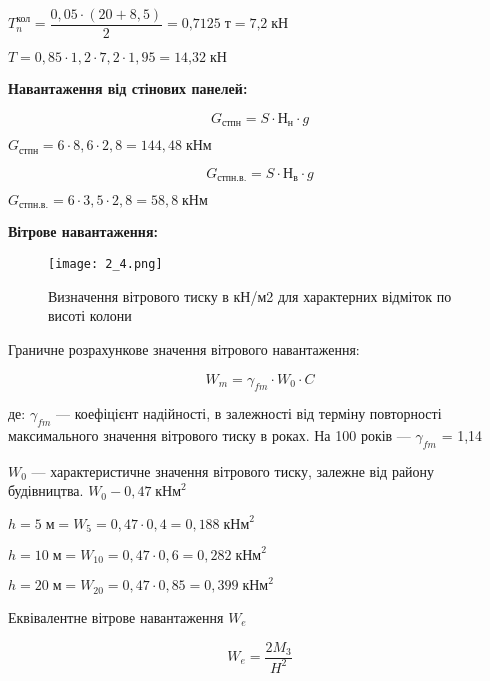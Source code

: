 \documentclass[a4paper,14pt]{article}
\begin{document}
$T^\textit{кол}_{n}=\dfrac {0,05\cdot (20+8,5)}{2}=\textit{0,7125}\;\textit{т}=\textit{7,2}\;\textit{кН}$

$T=0,85\cdot 1,2 \cdot 7,2 \cdot 1,95 = \textit{14,32}\;\textit{кН}$

\textbf{Навантаження від стінових панелей:}

\begin{equation}
    G_\textit{стпн}= S \cdot Н_\textit{н}\cdot g
\end{equation}

$G_\textit{стпн}= 6 \cdot 8,6\cdot 2,8 = 144,48\;\textit{кНм}$

\begin{equation}
    G_\textit{стпн.в.}= S \cdot Н_\textit{в}\cdot g
\end{equation}

$G_\textit{стпн.в.}= 6 \cdot 3,5\cdot 2,8= 58,8\;\textit{кНм}$

\textbf{Вітрове навантаження:}

\begin{figure}[h!]
    \begin{center}
        \texttt{[image: 2\_4.png]}
        \caption{Визначення вітрового тиску в кН/м2  для характерних відміток  по висоті колони }\label{ris2_4} 
    \end{center}
\end{figure}
Граничне розрахункове значення вітрового навантаження:

\begin{equation}
    W_\textit{m}= \gamma_{fm} \cdot W_\textit{0}\cdot C
\end{equation}

де:  $\gamma_{fm}$ ---  коефіцієнт надійності, в залежності від терміну повторності максимального значення вітрового тиску в роках. На 100 років --- $\gamma_{fm}$ = 1,14

$W_\textit{0}$ --- характеристичне значення вітрового тиску, залежне від району будівництва. $W_\textit{0} - 0,47\;\textit{кНм}^2$

$h=5\;\textit{м} = W_{5}= 0,47\cdot 0,4 = 0,188\;\textit{кНм}^2$

$h=10\;\textit{м} = W_{10}= 0,47\cdot 0,6 = 0,282\;\textit{кНм}^2$

$h=20\;\textit{м} = W_{20}= 0,47\cdot 0,85 = 0,399\;\textit{кНм}^2$

Еквівалентне вітрове навантаження $W_e$

\begin{equation}
    W_\textit{e}= \dfrac{2M_3}{H^2}
\end{equation}
\end{document}
